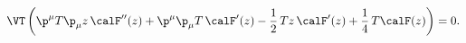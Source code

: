 \begin{equation}
 \VT \left( \p^\mu T \p_\mu z \,\calF''(z) +\p^\mu \p_\mu T
 \,\calF'(z) -\frac{1}{2}\,T z\,\calF'(z) +\frac{1}{4}\,T\calF(z)
 \right)=0. \label{EoM0}
\end{equation}

